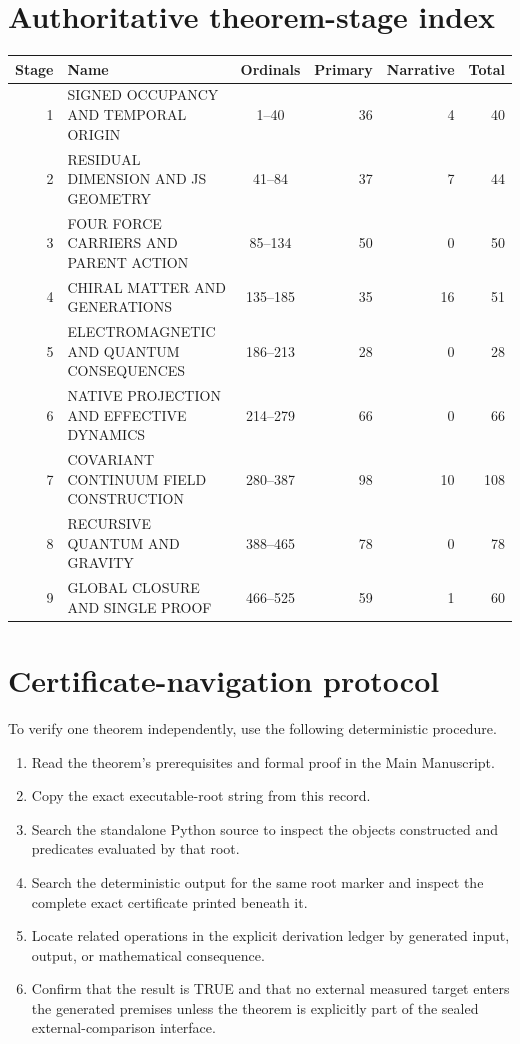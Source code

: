 \documentclass[11pt]{article}
\numberwithin{equation}{section}
\theoremstyle{remark}
\begin{document}
\section{Authoritative theorem-stage index}
\begin{longtable}{r p{7.0cm} c r r r}
\toprule Stage&Name&Ordinals&Primary&Narrative&Total\\\midrule\endhead
1&SIGNED OCCUPANCY AND TEMPORAL ORIGIN&1--40&36&4&40\\
2&RESIDUAL DIMENSION AND JS GEOMETRY&41--84&37&7&44\\
3&FOUR FORCE CARRIERS AND PARENT ACTION&85--134&50&0&50\\
4&CHIRAL MATTER AND GENERATIONS&135--185&35&16&51\\
5&ELECTROMAGNETIC AND QUANTUM CONSEQUENCES&186--213&28&0&28\\
6&NATIVE PROJECTION AND EFFECTIVE DYNAMICS&214--279&66&0&66\\
7&COVARIANT CONTINUUM FIELD CONSTRUCTION&280--387&98&10&108\\
8&RECURSIVE QUANTUM AND GRAVITY&388--465&78&0&78\\
9&GLOBAL CLOSURE AND SINGLE PROOF&466--525&59&1&60\\
\bottomrule
\end{longtable}

\section{Certificate-navigation protocol}
To verify one theorem independently, use the following deterministic procedure.
\begin{enumerate}
\item Read the theorem's prerequisites and formal proof in the Main Manuscript.
\item Copy the exact executable-root string from this record.
\item Search the standalone Python source to inspect the objects constructed and predicates evaluated by that root.
\item Search the deterministic output for the same root marker and inspect the complete exact certificate printed beneath it.
\item Locate related operations in the explicit derivation ledger by generated input, output, or mathematical consequence.
\item Confirm that the result is TRUE and that no external measured target enters the generated premises unless the theorem is explicitly part of the sealed external-comparison interface.
\end{enumerate}
\end{document}
